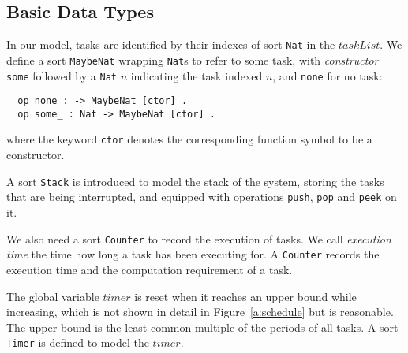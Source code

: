\documentclass[10pt,journal]{IEEEtran}
\newcommand{\hide}[1]{\ignorespaces}
\begin{document}
{\subsection{Basic Data Types}
In our model, tasks are identified by their indexes of sort \verb|Nat|
in the $taskList$. We define a sort \verb|MaybeNat| wrapping
\verb|Nat|s to refer to some task, with \emph{constructor} \verb|some|
followed by a \verb|Nat| $n$ indicating the task indexed $n$, and
\verb|none| for no task:
\begin{verbatim}
  op none : -> MaybeNat [ctor] .
  op some_ : Nat -> MaybeNat [ctor] .
\end{verbatim}
where the keyword \verb|ctor| denotes the corresponding function
symbol to be a constructor.

A sort \verb|Stack| is introduced to model the stack of the system,
storing the tasks that are being interrupted, and equipped with
operations \verb|push|, \verb|pop| and \verb|peek| on it.
\hide{
\begin{verbatim}
  op bottom : -> Stack [ctor] .
  op _#_ : Nat Stack -> Stack [ctor] .
\end{verbatim}
}

We also need
a sort \verb|Counter| to record the execution of tasks.  We call
\emph{execution time} the time how long a task has been executing
for. A \verb|Counter| records the execution time and the computation
requirement of a task.
\hide{
\begin{verbatim}
  op [_/_] : Time Time -> Counter [ctor] .
\end{verbatim}
}

\hide{
At last, to make our model checkable by untimed model checking, it is
reasonable to reset the global variable $timer$ when it reaches an
upper bound while increasing (see Line~\ref{l:timer} in
Figure~\ref{a:schedule}) in the model. Then $timer$ is of sort
\verb|Timer| and the upper bound would be the least common multiple of
the periods of all tasks.}

The global variable $timer$ is reset when it reaches an upper bound
while increasing, which is not shown in detail in
Figure~\ref{a:schedule} but is reasonable. The upper bound is the
least common multiple of the periods of all tasks. A sort \verb|Timer|
is defined to model the $timer$.
\hide{
\begin{verbatim}
  op [_/_] : Nat NzNat -> Timer [ctor] .
\end{verbatim}
}

}
\end{document}

